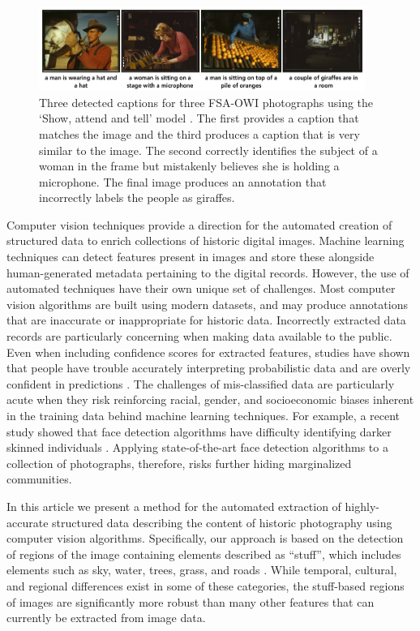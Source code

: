 \documentclass[10pt, a4paper]{article}
\begin{document}
\begin{figure}[!ht]
\begin{center}
\includegraphics[width=0.95\textwidth]{../figures/captions.png}
\caption{Three detected captions for three FSA-OWI photographs using the
`Show, attend and tell' model \protect\cite{xu2015show}. The first provides a
caption that matches the image and the third produces a caption that is very
similar to the image. The second correctly identifies the subject of a woman
in the frame but mistakenly believes she is holding a microphone. The final
image produces an annotation that incorrectly labels the people as giraffes.}
\label{fig:captions}
\end{center}
\end{figure}

Computer vision techniques provide a direction for the automated creation of
structured data to enrich collections of historic digital images. Machine
learning techniques can detect features present in images and store these
alongside human-generated metadata pertaining to the digital records. However,
the use of automated techniques have their own unique set of challenges. Most
computer vision algorithms are built using modern datasets, and may produce
annotations that are inaccurate or inappropriate for historic data. Incorrectly
extracted data records are particularly concerning when making data available
to the public. Even when including confidence scores for extracted features,
studies have shown that people have trouble accurately interpreting probabilistic
data and are overly confident in predictions \cite{khaw2019individual}.
The challenges of mis-classified data are particularly acute when they risk
reinforcing racial, gender, and socioeconomic biases inherent in the training
data behind machine learning techniques. For example, a recent study showed
that face
detection algorithms have difficulty identifying darker skinned individuals
\cite{buolamwini2018gender}. Applying state-of-the-art face detection
algorithms to a collection of photographs, therefore, risks further hiding
marginalized communities.

In this article we present a method for the automated extraction of
highly-accurate structured data describing the content of historic photography
using computer vision algorithms. Specifically, our approach is based on the
detection of regions of the image containing elements described as ``stuff'',
which includes elements such as sky, water, trees, grass, and roads
\cite{caesar2018coco}. While temporal, cultural,
and regional differences  exist in some of these categories, the
stuff-based regions of images are significantly more robust than many other
features that can currently be extracted from image data.
\end{document}

